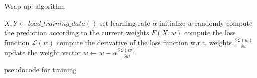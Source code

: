\bgroup  
\begin{frame}{Wrap up: algorithm}
\begin{algorithm}[H]
\begin{algorithmic}[1]
\STATE $X, Y \leftarrow load\_training\_data()$
\STATE set learning rate $\alpha$
\STATE initialize $w$ randomly
\STATE compute the prediction according to the current weights $F(X, w)$
\STATE compute the loss function $\mathcal{L}(w)$
\STATE compute the derivative of the loss function w.r.t. weights $\frac{\delta \mathcal{L}(w)}{\delta w}$
\STATE update the weight vector $w \leftarrow w - \alpha\frac{\delta \mathcal{L}(w)}{\delta w}$
\ENDFOR
\end{algorithmic}
\caption{pseudocode for training}
\label{alg:train}
\end{algorithm}
\end{frame}
\egroup